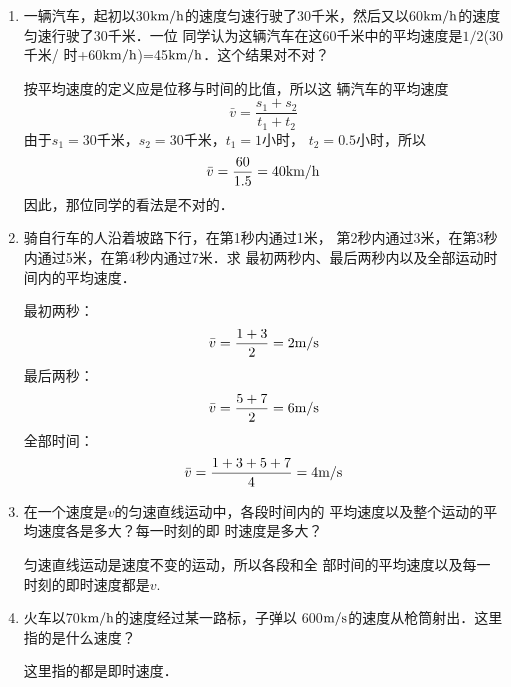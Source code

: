 \begin{enumerate}
    \item 一辆汽车，起初以30$\text{km}/\text{h}$的速度匀速行驶了30千米，然后又以60$\text{km}/\text{h}$的速度匀速行驶了30千米．一位
    同学认为这辆汽车在这60千米中的平均速度是$1/2$(30千米/
    时+60$\text{km}/\text{h}$)=45$\text{km}/\text{h}$．这个结果对不对？

\begin{solution}
    按平均速度的定义应是位移与时间的比值，所以这
辆汽车的平均速度
\[\bar v=\frac{s_1+s_2}{t_1+t_2}\]
由于$s_1=30$千米，$s_2=30$千米，$t_1=1$小时，
$t_2=0.5$小时，所以
\[\bar v=\frac{60}{1.5}=40\text{km}/\text{h}\]
因此，那位同学的看法是不对的．
\end{solution}
    \item 骑自行车的人沿着坡路下行，在第1秒内通过1米，
    第2秒内通过3米，在第3秒内通过5米，在第4秒内通过7米．求
    最初两秒内、最后两秒内以及全部运动时间内的平均速度．

    \begin{solution}
最初两秒：
\[\bar v=\frac{1+3}{2}=2\text{m}/\text{s}\]
最后两秒：
\[\bar v=\frac{5+7}{2}=6\text{m}/\text{s}\]
全部时间：
\[\bar v=\frac{1+3+5+7}{4}=4\text{m}/\text{s}\]
    \end{solution}
    \item 在一个速度是$v$的匀速直线运动中，各段时间内的
    平均速度以及整个运动的平均速度各是多大？每一时刻的即
    时速度是多大？

    \begin{solution}
        匀速直线运动是速度不变的运动，所以各段和全
部时间的平均速度以及每一时刻的即时速度都是$v$. 
    \end{solution}
    \item 火车以70$\text{km}/\text{h}$的速度经过某一路标，子弹以
    600$\text{m}/\text{s}$的速度从枪筒射出．这里指的是什么速度？
    
\begin{solution}
    这里指的都是即时速度．
\end{solution}
\end{enumerate}

